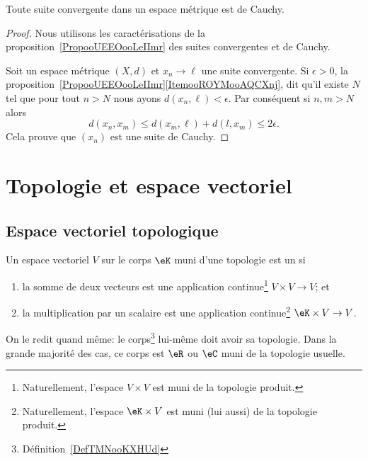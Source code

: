 \begin{proposition}     \label{PROPooZZNWooHghltd}
    Toute suite convergente dans un espace métrique est de Cauchy.
\end{proposition}

\begin{proof}
    Nous utilisons les caractérisations de la proposition~\ref{PropooUEEOooLeIImr} des suites convergentes et de Cauchy.

    Soit un espace métrique \( (X,d)\) et \( x_n\to\ell\) une suite convergente. Si \( \epsilon>0\), la proposition~\ref{PropooUEEOooLeIImr}\ref{ItemooROYMooAQCXnj}, dit qu'il existe \( N\) tel que pour tout \( n>N\) nous ayons \( d(x_n,\ell)<\epsilon\). Par conséquent si \( n,m>N\) alors
    \begin{equation}
        d(x_n,x_m)\leq d(x_m,\ell)+d(l,x_m)\leq 2\epsilon.
    \end{equation}
    Cela prouve que \( (x_n)\) est une suite de Cauchy.
\end{proof}

\section{Topologie et espace vectoriel}

\subsection{Espace vectoriel topologique}

\begin{definition}\label{DefEVTopologique}
  Un espace vectoriel \( V\) sur le corps \( \eK\) muni d'une topologie est un  si
    \begin{enumerate}
        \item
            la somme de deux vecteurs est une application continue\footnote{Naturellement, l'espace \(V \times V \) est muni de la topologie produit.} \( V\times V\to V \); et
        \item
            la multiplication par un scalaire est une application continue\footnote{Naturellement, l'espace \(\eK \times V \) est muni (lui aussi) de la topologie produit.} \( \eK\times V\to V\).
    \end{enumerate}
\end{definition}
On le redit quand même: le corps\footnote{Définition~\ref{DefTMNooKXHUd}} lui-même doit avoir sa topologie. Dans la grande majorité des cas, ce corps est \( \eR\) ou \( \eC\) muni de la topologie usuelle.

